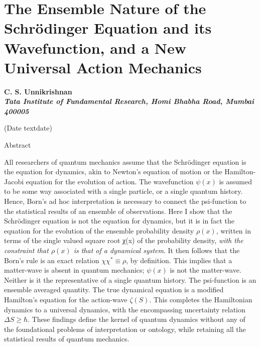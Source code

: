 \chapter{The Ensemble Nature of the Schr\"{o}dinger Equation and its Wavefunction, and a New Universal Action Mechanics}\label{chap27}


\begin{center}
\textbf{C. S. Unnikrishnan}\\
\textbf{\textit{Tata Institute of Fundamental Research, Homi Bhabha Road, Mumbai 400005}}
\end{center}

\begin{center}
(Date textdate)\\

\medskip

Abstract
\end{center}


All researchers of quantum mechanics assume that the Schr\"{o}dinger equation is the equation for
dynamics, akin to Newton's equation of motion or the Hamilton-Jacobi equation for the evolution
of action. The wavefunction $\psi(x)$ is assumed to be some way associated with a single particle,
or a single quantum history. Hence, Born's ad hoc interpretation is necessary to connect the psi-function to the statistical results of an ensemble of observations. Here I show that the Schr\"{o}dinger
equation is not the equation for dynamics, but it is in fact the equation for the evolution of
the ensemble probability density $\rho(x)$, written in terms of the single valued square root χ(x)
of the probability density, \textit{with the constraint that $\rho(x)$ is that of a dynamical system}. It then
follows that the Born's rule is an exact relation $\chi \chi^{\ast} \equiv \rho$, by definition. This implies that a
matter-wave is absent in quantum mechanics; $\psi(x)$ is not the matter-wave. Neither is it the
representative of a single quantum history. The psi-function is an ensemble averaged quantity.
The true dynamical equation is a modified Hamilton's equation for the action-wave $\zeta(S)$. This
completes the Hamiltonian dynamics to a universal dynamics, with the encompassing uncertainty
relation $\Delta S \geq \hbar$. These findings define the kernel of quantum dynamics without any of the
foundational problems of interpretation or ontology, while retaining all the statistical results of
quantum mechanics.


